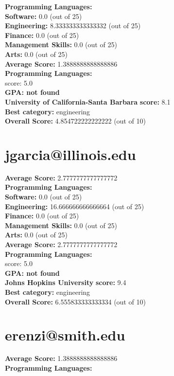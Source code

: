 \documentclass{article}
\begin{document}
\textbf{Programming Languages:} \\
\textbf{Software:} 0.0 (out of 25)\\
    \textbf{Engineering: } 8.333333333333332 (out of 25)\\
    \textbf{Finance:} 0.0 (out of 25)\\
    \textbf{Management Skills:} 0.0 (out of 25)\\
    \textbf{Arts:} 0.0 (out of 25)\\
\textbf{Average Score: } 1.3888888888888886\\
\textbf{Programming Languages:} \\
score: 5.0\\
\textbf{GPA: not found}\\
\textbf{University of California-Santa Barbara} \textbf{score:} 8.1\\
\textbf{Best category: } engineering\\
    \textbf{Overall Score: }4.854722222222222 (out of 10)\section{jgarcia@illinois.edu}
\textbf{Average Score: } 2.7777777777777772\\
\textbf{Programming Languages:} \\
\textbf{Software:} 0.0 (out of 25)\\
    \textbf{Engineering: } 16.666666666666664 (out of 25)\\
    \textbf{Finance:} 0.0 (out of 25)\\
    \textbf{Management Skills:} 0.0 (out of 25)\\
    \textbf{Arts:} 0.0 (out of 25)\\
\textbf{Average Score: } 2.7777777777777772\\
\textbf{Programming Languages:} \\
score: 5.0\\
\textbf{GPA: not found}\\
\textbf{Johns Hopkins University} \textbf{score:} 9.4\\
\textbf{Best category: } engineering\\
    \textbf{Overall Score: }6.555833333333334 (out of 10)\section{erenzi@smith.edu}
\textbf{Average Score: } 1.3888888888888886\\
\textbf{Programming Languages:} \\
\end{document}
